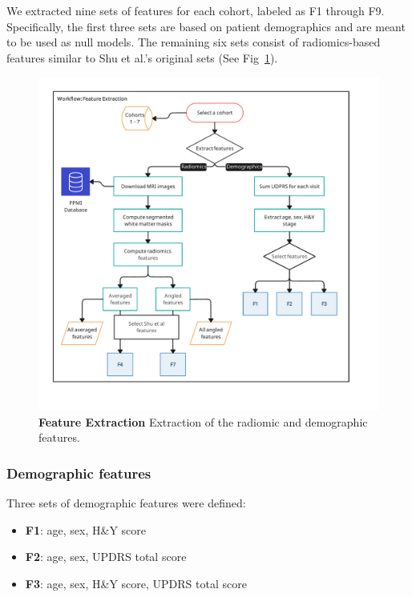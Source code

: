 We extracted nine sets of features for each cohort, labeled as F1 through F9.  Specifically, 
the first three sets are based on patient demographics and are meant to be used as null models. The remaining six sets consist of radiomics-based features similar to Shu et al.'s original sets (See Fig~\ref{featureExtraction}).

\begin{figure}[!ht]
  \centering
  \includegraphics[width=\linewidth]{images/Workflow_feature_extraction.pdf}
  \caption{{\bf Feature Extraction} Extraction of the radiomic and demographic features.}
  \label{featureExtraction}
\end{figure}

\subsubsection*{Demographic features}
Three sets of demographic features were defined:

\begin{itemize}
    \item \textbf{F1}: age, sex, H\&Y score
    \item \textbf{F2}: age, sex, UPDRS total score
    \item \textbf{F3}: age, sex, H\&Y score, UPDRS total score
\end{itemize}


